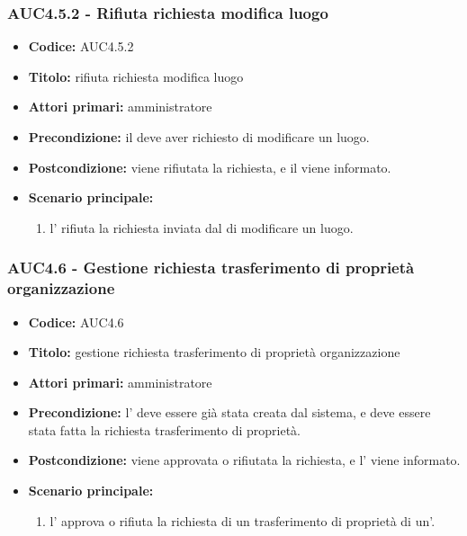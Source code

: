 \documentclass[casi-duso]{subfiles}
\begin{document}
\subsubsection{AUC4.5.2 - Rifiuta richiesta modifica luogo}%
\label{subsub:AUC4.5.2}
\begin{itemize}
  \item \textbf{Codice:} AUC4.5.2
  \item \textbf{Titolo:} rifiuta richiesta modifica luogo
  \item \textbf{Attori primari:} amministratore
  \item \textbf{Precondizione:} il  deve aver richiesto di modificare un luogo.
  \item \textbf{Postcondizione:} viene rifiutata la richiesta, e il  viene informato.
  \item \textbf{Scenario principale:}
  \begin{enumerate}
    \item l' rifiuta la richiesta inviata dal  di modificare un luogo.
  \end{enumerate}
\end{itemize}

\subsubsection{AUC4.6 - Gestione richiesta trasferimento di proprietà organizzazione}%
\label{subsub:AUC4.6}
\begin{itemize}
  \item \textbf{Codice:} AUC4.6
  \item \textbf{Titolo:} gestione richiesta trasferimento di proprietà organizzazione
  \item \textbf{Attori primari:} amministratore
  \item \textbf{Precondizione:} l' deve essere già stata creata dal sistema, e deve essere stata fatta la richiesta trasferimento di proprietà.
  \item \textbf{Postcondizione:} viene approvata o rifiutata la richiesta, e l' viene informato.
  \item \textbf{Scenario principale:}
  \begin{enumerate}
    \item l' approva o rifiuta la richiesta di un trasferimento di proprietà di un'.
  \end{enumerate}
\end{itemize}
\end{document}
